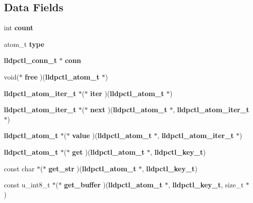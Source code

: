 \subsection*{\-Data \-Fields}
\begin{DoxyCompactItemize}
\item 
int {\bfseries count}\label{structlldpctl__atom__t_ad43c3812e6d13e0518d9f8b8f463ffcf}

\item 
atom\-\_\-t {\bfseries type}\label{structlldpctl__atom__t_abdbec1b06da35337979bb89b80f2cbdc}

\item 
{\bf lldpctl\-\_\-conn\-\_\-t} $\ast$ {\bfseries conn}\label{structlldpctl__atom__t_a8495e9c37587c79ff33a4ea9b40b7087}

\item 
void($\ast$ {\bfseries free} )({\bf lldpctl\-\_\-atom\-\_\-t} $\ast$)\label{structlldpctl__atom__t_abf37b809c354846f69a660ba2ab4f12e}

\item 
{\bf lldpctl\-\_\-atom\-\_\-iter\-\_\-t} $\ast$($\ast$ {\bfseries iter} )({\bf lldpctl\-\_\-atom\-\_\-t} $\ast$)\label{structlldpctl__atom__t_ac576180f19590b1e13fd216d65436f39}

\item 
{\bf lldpctl\-\_\-atom\-\_\-iter\-\_\-t} $\ast$($\ast$ {\bfseries next} )({\bf lldpctl\-\_\-atom\-\_\-t} $\ast$, {\bf lldpctl\-\_\-atom\-\_\-iter\-\_\-t} $\ast$)\label{structlldpctl__atom__t_a36d0e289dbebcfb4ed3b2954405fb544}

\item 
{\bf lldpctl\-\_\-atom\-\_\-t} $\ast$($\ast$ {\bfseries value} )({\bf lldpctl\-\_\-atom\-\_\-t} $\ast$, {\bf lldpctl\-\_\-atom\-\_\-iter\-\_\-t} $\ast$)\label{structlldpctl__atom__t_ac96678858ceac38733976a89542877e3}

\item 
{\bf lldpctl\-\_\-atom\-\_\-t} $\ast$($\ast$ {\bfseries get} )({\bf lldpctl\-\_\-atom\-\_\-t} $\ast$, {\bf lldpctl\-\_\-key\-\_\-t})\label{structlldpctl__atom__t_ae15e764c71411c0c52eff124a0baa413}

\item 
const char $\ast$($\ast$ {\bfseries get\-\_\-str} )({\bf lldpctl\-\_\-atom\-\_\-t} $\ast$, {\bf lldpctl\-\_\-key\-\_\-t})\label{structlldpctl__atom__t_a9ecc4fbd95df2d106e004677ad3f86ea}

\item 
const u\-\_\-int8\-\_\-t $\ast$($\ast$ {\bfseries get\-\_\-buffer} )({\bf lldpctl\-\_\-atom\-\_\-t} $\ast$, {\bf lldpctl\-\_\-key\-\_\-t}, size\-\_\-t $\ast$)\label{structlldpctl__atom__t_ad81a05eb99677eeb9e5ac7226e34a9c6}


\end{DoxyCompactItemize}
